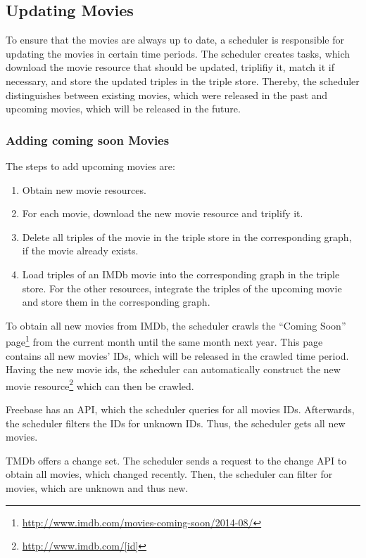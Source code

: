 \subsection{Updating Movies}
\label{subsec_method_updating}

To ensure that the movies are always up to date, a scheduler is responsible for updating the movies in certain time periods.
The scheduler creates tasks, which download the movie resource that should be updated, triplifiy it, match it if necessary, and store the updated triples in the triple store.
Thereby, the scheduler distinguishes between existing movies, which were released in the past and upcoming movies, which will be released in the future.

\subsubsection{Adding coming soon Movies}
The steps to add upcoming movies are:
\begin {enumerate}
	\item Obtain new movie resources.
	\item For each movie, download the new movie resource and triplify it.
	\item Delete all triples of the movie in the triple store in the corresponding graph, if the movie already exists.
	\item Load triples of an IMDb movie into the corresponding graph in the triple store. For the other resources, integrate the triples of the upcoming movie and store them in the corresponding graph.
\end{enumerate}

To obtain all new movies from IMDb, the scheduler crawls the ``Coming Soon'' page\footnote{\url{http://www.imdb.com/movies-coming-soon/2014-08/}} from the current month until the same month next year.
This page contains all new movies' IDs, which will be released in the crawled time period.
Having the new movie ids, the scheduler can automatically construct the new movie resource\footnote{\url{http://www.imdb.com/[id]}} which can then be crawled.

Freebase has an API, which the scheduler queries for all movies IDs.
Afterwards, the scheduler filters the IDs for unknown IDs.
Thus, the scheduler gets all new movies.

TMDb offers a change set.
The scheduler sends a request to the change API to obtain all movies, which changed recently.
Then, the scheduler can filter for movies, which are unknown and thus new.

